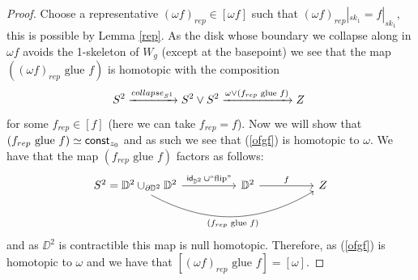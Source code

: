 \begin{proof}
Choose a representative $(\omega f)_{rep} \in [\omega f]$ such that $(\omega f)_{rep}|_{sk_{1}} = f|_{sk_{1}},$ this is possible by Lemma \ref{rep}. As the disk whose boundary we collapse along in $\omega f$ avoids the 1-skeleton of $W_{g}$ (except at the basepoint) we see that the map $((\omega f )_{rep} \text{ glue } f)$ is homotopic with the composition
\begin{equation} \label{ofgf}
S^{2} \xrightarrow{collapse_{S^{1}}} S^{2} \vee S^{2} \xrightarrow{\omega \vee (f_{rep}  \text{ glue } f)} Z~
\end{equation}
for some $f_{rep} \in [f]$ (here we can take $f_{rep} = f$). Now we will show that $(f_{rep}  \text{ glue } f) \simeq {\sf const}_{z_{0}}$ and as such we see that (\ref{ofgf}) is homotopic to $\omega.$ 
We have that the map $(f_{rep} \text{ glue } f)$ factors as follows:
\[
\begin{tikzcd}
S^{2} = \DD^{2} \cup_{\partial \DD^{2}} \DD^{2} \arrow[rr, "\id_{\DD^{2}} \cup \text{``flip''}"] 
\arrow[bend right=30,swap]{rrrr}{(f_{rep} \text{ glue } f)}
&&
\DD^{2}  \arrow[rr, "f"]
&&
Z
\end{tikzcd}
\]
and as $\DD^{2}$ is contractible this map is null homotopic. Therefore, as (\ref{ofgf}) is homotopic to $\omega$ and we have that $[(\omega f )_{rep} \text{ glue } f] = [\omega].$



\end{proof}




